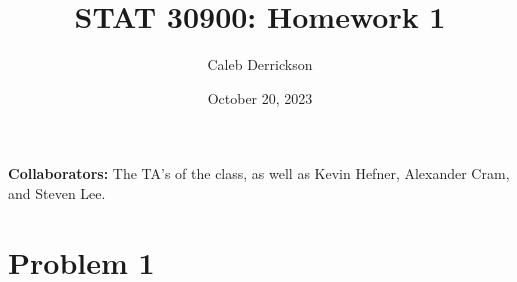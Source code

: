 

\title{STAT 30900: Homework 1}
\author{Caleb Derrickson}
\date{October 20, 2023}


\onehalfspacing
\maketitle

{\color{cit}\vspace{2mm}\noindent\textbf{Collaborators:}} The TA's of the class, as well as Kevin Hefner, Alexander Cram, and Steven Lee.

\tableofcontents

\newpage
\section{Problem 1}

